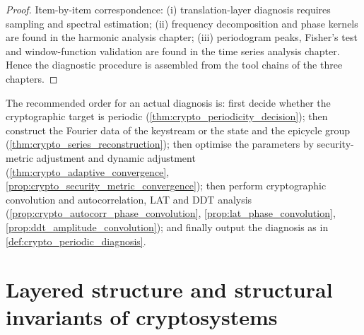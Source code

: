 \begin{proof}
Item-by-item correspondence:
(i) translation-layer diagnosis requires sampling and spectral estimation;
(ii) frequency decomposition and phase kernels are found in the harmonic analysis chapter;
(iii) periodogram peaks, Fisher's test and window-function validation are found in the time series analysis chapter.
Hence the diagnostic procedure is assembled from the tool chains of the three chapters.
\end{proof}

\begin{remark}\label{rem:crypto_integration_order}
The recommended order for an actual diagnosis is: first decide whether the cryptographic target is periodic (\cref{thm:crypto_periodicity_decision}); then construct the Fourier data of the keystream or the state and the epicycle group (\cref{thm:crypto_series_reconstruction}); then optimise the parameters by security-metric adjustment and dynamic adjustment (\cref{thm:crypto_adaptive_convergence}, \cref{prop:crypto_security_metric_convergence}); then perform cryptographic convolution and autocorrelation, LAT and DDT analysis (\cref{prop:crypto_autocorr_phase_convolution}, \cref{prop:lat_phase_convolution}, \cref{prop:ddt_amplitude_convolution}); and finally output the diagnosis as in \cref{def:crypto_periodic_diagnosis}.
\end{remark}

\section{Layered structure and structural invariants of cryptosystems}
\label{sec:crypto_layers_and_invariants}

